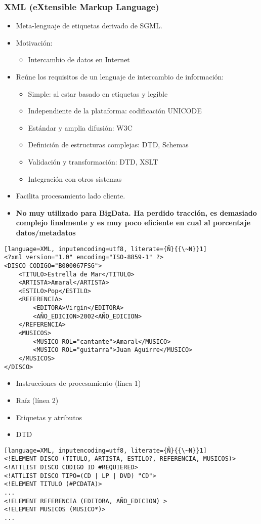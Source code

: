 \subsubsection{XML (eXtensible Markup Language)}
\begin{itemize}
\item Meta-lenguaje de etiquetas derivado de SGML.
\item Motivación:
\begin{itemize}
\item Intercambio de datos en Internet
\end{itemize}
\item Reúne los requisitos de un lenguaje de intercambio de información:
\begin{itemize}
\item Simple: al estar basado en etiquetas y legible
\item Independiente de la plataforma: codificación UNICODE
\item Estándar y amplia difusión: W3C
\item Definición de estructuras complejas: DTD, Schemas
\item Validación y transformación: DTD, XSLT
\item Integración con otros sistemas
\end{itemize}
\item Facilita procesamiento lado cliente.
\item \textbf{No muy utilizado para BigData. Ha perdido tracción, es demasiado complejo finalmente y es muy poco eficiente en cual al porcentaje datos/metadatos}
\end{itemize}
\Ej
\begin{lstlisting}[language=XML, inputencoding=utf8, literate={Ñ}{{\~N}}1]
<?xml version="1.0" encoding="ISO-8859-1" ?>
<DISCO CODIGO="B000067FSG">
	<TITULO>Estrella de Mar</TITULO>
	<ARTISTA>Amaral</ARTISTA>
	<ESTILO>Pop</ESTILO>
	<REFERENCIA>
		<EDITORA>Virgin</EDITORA>
		<AÑO_EDICION>2002<AÑO_EDICION>
	</REFERENCIA>
	<MUSICOS>
		<MUSICO ROL="cantante">Amaral</MUSICO>
		<MUSICO ROL="guitarra">Juan Aguirre</MUSICO>
	</MUSICOS>
</DISCO>
\end{lstlisting}
\begin{itemize}
\item Instrucciones de procesamiento (línea 1)
\item Raíz (línea 2)
\item Etiquetas y atributos
\end{itemize}
\begin{itemize}[label=\color{red}\textbullet, leftmargin=*]
	\item \color{lightblue}DTD
\end{itemize}
\begin{lstlisting}[language=XML, inputencoding=utf8, literate={Ñ}{{\~N}}1]
<!ELEMENT DISCO (TITULO, ARTISTA, ESTILO?, REFERENCIA, MUSICOS)>
<!ATTLIST DISCO CODIGO ID #REQUIERED>
<!ATTLIST DISCO TIPO=(CD | LP | DVD) "CD">
<!ELEMENT TITULO (#PCDATA)>
...
<!ELEMENT REFERENCIA (EDITORA, AÑO_EDICION) >
<!ELEMENT MUSICOS (MUSICO*)>
...
\end{lstlisting}

